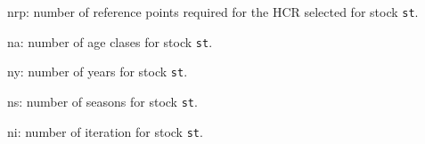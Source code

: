 \begin{landscape}
\begin{table}[!ht]
\begin{footnotesize}
\begin{threeparttable}
      \begin{tablenotes}
        \item nrp: number of reference points required for the HCR selected for stock \texttt{st}.
        \item na: number of age clases for stock \texttt{st}.
        \item ny: number of years for stock \texttt{st}.
        \item ns: number of seasons for stock \texttt{st}.
        \item ni: number of iteration for stock \texttt{st}.
      \end{tablenotes}

    \end{threeparttable}
  \end{footnotesize}

\end{table}



\end{landscape}